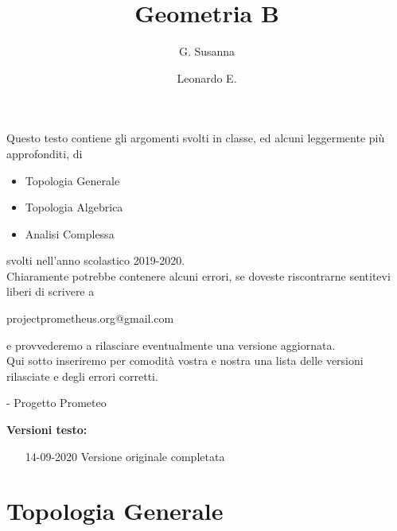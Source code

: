 \documentclass[a4paper, twoside]{book}
\begin{document}

\setcounter{page}{1} %


\title{Geometria B}
\author{G. Susanna \and Leonardo E.}
\maketitle


\frontmatter
\setcounter{page}{1}
\tableofcontents


\mainmatter

Questo testo contiene gli argomenti svolti in classe, ed alcuni leggermente più approfonditi, di
\begin{itemize}
	\item Topologia Generale
	\item Topologia Algebrica
	\item Analisi Complessa
\end{itemize}
svolti nell'anno scolastico 2019-2020. \\ Chiaramente potrebbe contenere alcuni errori, se doveste riscontrarne sentitevi liberi di scrivere a 

	\begin{verbatim*}
	projectprometheus.org@gmail.com
	\end{verbatim*}

e provvederemo a rilasciare eventualmente una versione aggiornata. \\ Qui sotto inseriremo per comodità vostra e nostra una lista delle versioni rilasciate e degli errori corretti.
\begin{flushright}
	- Progetto Prometeo
\end{flushright}
\newpage
\begin{flushleft}
	\textbf{{\Large Versioni testo:}}
\end{flushleft}
\begin{itemize}
	\item[14-09-2020] Versione originale completata
\end{itemize}

\part{Topologia Generale}
 
\end{document}
